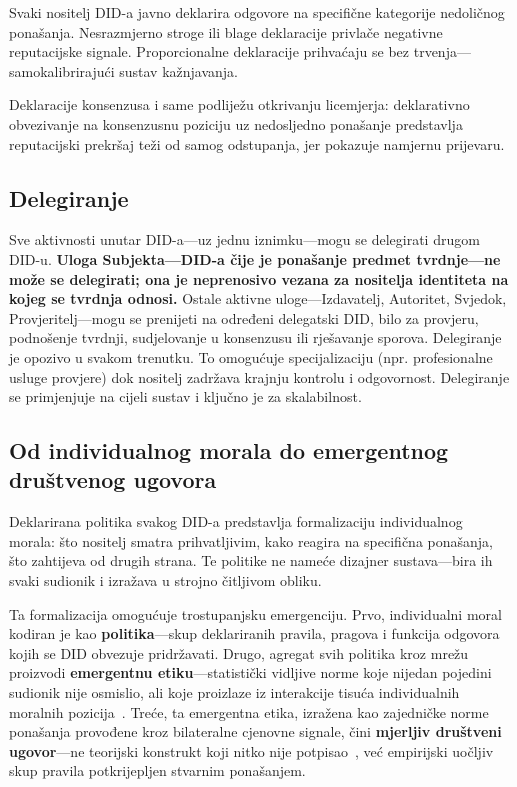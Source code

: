 \documentclass[11pt,a4paper,twocolumn]{article}
\begin{document}
Svaki nositelj DID-a javno deklarira odgovore na specifične kategorije nedoličnog ponašanja. Nesrazmjerno stroge ili blage deklaracije privlače negativne reputacijske signale. Proporcionalne deklaracije prihvaćaju se bez trvenja---samokalibrirajući sustav kažnjavanja.

Deklaracije konsenzusa i same podliježu otkrivanju licemjerja: deklarativno obvezivanje na konsenzusnu poziciju uz nedosljedno ponašanje predstavlja reputacijski prekršaj teži od samog odstupanja, jer pokazuje namjernu prijevaru.

\subsection{Delegiranje}

Sve aktivnosti unutar DID-a---uz jednu iznimku---mogu se delegirati drugom DID-u. \textbf{Uloga Subjekta---DID-a čije je ponašanje predmet tvrdnje---ne može se delegirati; ona je neprenosivo vezana za nositelja identiteta na kojeg se tvrdnja odnosi.} Ostale aktivne uloge---Izdavatelj, Autoritet, Svjedok, Provjeritelj---mogu se prenijeti na određeni delegatski DID, bilo za provjeru, podnošenje tvrdnji, sudjelovanje u konsenzusu ili rješavanje sporova. Delegiranje je opozivo u svakom trenutku. To omogućuje specijalizaciju (npr. profesionalne usluge provjere) dok nositelj zadržava krajnju kontrolu i odgovornost. Delegiranje se primjenjuje na cijeli sustav i ključno je za skalabilnost.

\subsection{Od individualnog morala do emergentnog društvenog ugovora}

Deklarirana politika svakog DID-a predstavlja formalizaciju individualnog morala: što nositelj smatra prihvatljivim, kako reagira na specifična ponašanja, što zahtijeva od drugih strana. Te politike ne nameće dizajner sustava---bira ih svaki sudionik i izražava u strojno čitljivom obliku.

Ta formalizacija omogućuje trostupanjsku emergenciju. Prvo, individualni moral kodiran je kao \textbf{politika}---skup deklariranih pravila, pragova i funkcija odgovora kojih se DID obvezuje pridržavati. Drugo, agregat svih politika kroz mrežu proizvodi \textbf{emergentnu etiku}---statistički vidljive norme koje nijedan pojedini sudionik nije osmislio, ali koje proizlaze iz interakcije tisuća individualnih moralnih pozicija~\cite{durkheim1893}. Treće, ta emergentna etika, izražena kao zajedničke norme ponašanja provođene kroz bilateralne cjenovne signale, čini \textbf{mjerljiv društveni ugovor}---ne teorijski konstrukt koji nitko nije potpisao~\cite{rawls1971}, već empirijski uočljiv skup pravila potkrijepljen stvarnim ponašanjem.
\end{document}
